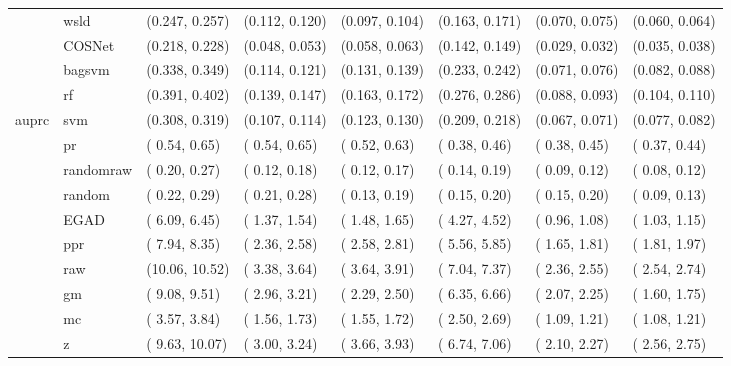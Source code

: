 \begin{table}[H]
{\begin{tabular}{llllllll}
 & wsld & (0.247, 0.257) & (0.112, 0.120) & (0.097, 0.104) & (0.163, 0.171) & (0.070, 0.075) & (0.060, 0.064)\\

 & COSNet & (0.218, 0.228) & (0.048, 0.053) & (0.058, 0.063) & (0.142, 0.149) & (0.029, 0.032) & (0.035, 0.038)\\

 & bagsvm & (0.338, 0.349) & (0.114, 0.121) & (0.131, 0.139) & (0.233, 0.242) & (0.071, 0.076) & (0.082, 0.088)\\

 & rf & (0.391, 0.402) & (0.139, 0.147) & (0.163, 0.172) & (0.276, 0.286) & (0.088, 0.093) & (0.104, 0.110)\\

\multirow{-15}{*}{\raggedright\arraybackslash auprc} & svm & (0.308, 0.319) & (0.107, 0.114) & (0.123, 0.130) & (0.209, 0.218) & (0.067, 0.071) & (0.077, 0.082)\\
\cmidrule{1-8}
 & pr & ( 0.54,  0.65) & ( 0.54,  0.65) & ( 0.52,  0.63) & ( 0.38,  0.46) & ( 0.38,  0.45) & ( 0.37,  0.44)\\

 & randomraw & ( 0.20,  0.27) & ( 0.12,  0.18) & ( 0.12,  0.17) & ( 0.14,  0.19) & ( 0.09,  0.12) & ( 0.08,  0.12)\\

 & random & ( 0.22,  0.29) & ( 0.21,  0.28) & ( 0.13,  0.19) & ( 0.15,  0.20) & ( 0.15,  0.20) & ( 0.09,  0.13)\\

 & EGAD & ( 6.09,  6.45) & ( 1.37,  1.54) & ( 1.48,  1.65) & ( 4.27,  4.52) & ( 0.96,  1.08) & ( 1.03,  1.15)\\

 & ppr & ( 7.94,  8.35) & ( 2.36,  2.58) & ( 2.58,  2.81) & ( 5.56,  5.85) & ( 1.65,  1.81) & ( 1.81,  1.97)\\

 & raw & (10.06, 10.52) & ( 3.38,  3.64) & ( 3.64,  3.91) & ( 7.04,  7.37) & ( 2.36,  2.55) & ( 2.54,  2.74)\\

 & gm & ( 9.08,  9.51) & ( 2.96,  3.21) & ( 2.29,  2.50) & ( 6.35,  6.66) & ( 2.07,  2.25) & ( 1.60,  1.75)\\

 & mc & ( 3.57,  3.84) & ( 1.56,  1.73) & ( 1.55,  1.72) & ( 2.50,  2.69) & ( 1.09,  1.21) & ( 1.08,  1.21)\\

 & z & ( 9.63, 10.07) & ( 3.00,  3.24) & ( 3.66,  3.93) & ( 6.74,  7.06) & ( 2.10,  2.27) & ( 2.56,  2.75)\\


\end{tabular}}
\end{table}
